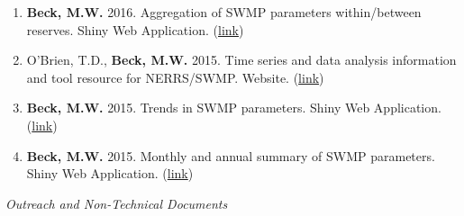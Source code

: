 \documentclass[letterpaper,12pt]{article}
\begin{document}
\begin{enumerate}
\item \textbf{Beck, M.W.} 2016. Aggregation of SWMP parameters within/between reserves. Shiny Web Application. ({\footnotesize\href{http://beckmw.shinyapps.io/swmp_agg}{link}})

\item O'Brien, T.D., \textbf{Beck, M.W.} 2015. Time series and data analysis information and tool resource for NERRS/SWMP. Website. ({\footnotesize\href{http://swmprats.net/}{link}})

\item \textbf{Beck, M.W.} 2015. Trends in SWMP parameters. Shiny Web Application. ({\footnotesize\href{http://beckmw.shinyapps.io/swmp_comp/}{link}})

\item \textbf{Beck, M.W.} 2015. Monthly and annual summary of SWMP parameters. Shiny Web Application. ({\footnotesize\href{http://beckmw.shinyapps.io/swmp_summary/}{link}})

\end{enumerate}

\vspace{\baselineskip} 
\centerline{\large{\textit{Outreach and Non-Technical Documents}}}
\end{document}
